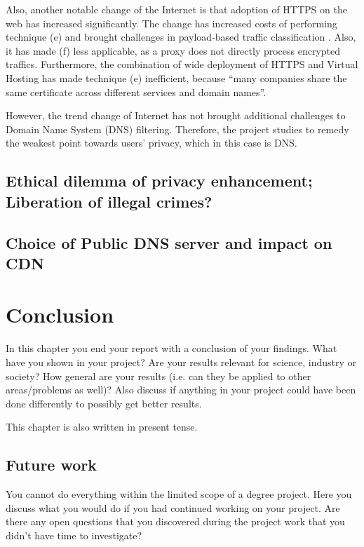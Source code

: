 \documentclass[a4paper,12pt]{article}
\begin{document}
Also, another notable change of the Internet is that adoption of HTTPS on the web has increased significantly\cite{felt2017measuring}.
The change has increased costs of performing technique (e) and brought challenges in payload-based traffic classification \cite{xue2013traffic}.
Also, it has made (f) less applicable, as a proxy does not directly process encrypted traffics\cite{shbair2015efficiently}.
Furthermore, the combination of wide deployment of HTTPS and Virtual Hosting has made technique (e) inefficient, because ``many companies share the same certificate across different services and domain names\cite{shbair2015efficiently}''.

However, the trend change of Internet has not brought additional challenges to Domain Name System (DNS) filtering. Therefore, the project studies to remedy the weakest point towards users' privacy, which in this case is DNS.

\subsection{Ethical dilemma of privacy enhancement; Liberation of illegal crimes?}
\subsection{Choice of Public DNS server and impact on CDN}
\newpage
		
\section{Conclusion}
In this chapter you end your report with a conclusion of your findings. What have you shown in your project? Are your results relevant for science, industry or society? How general are your results (i.e. can they be applied to other areas/problems as well)? Also discuss if anything in your project could have been done differently to possibly get better results. 

This chapter is also written in present tense.

\subsection{Future work}
You cannot do everything within the limited scope of a degree project. Here you discuss what you would do if you had continued working on your project. Are there any open questions that you discovered during the project work that you didn't have time to investigate?
\end{document}
